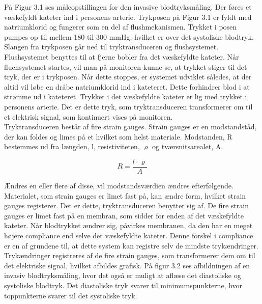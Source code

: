 På Figur 3.1 ses måleopstillingen for den invasive blodtryksmåling. Der føres et væskefyldt kateter ind i personens arterie. Trykposen på Figur 3.1 er fyldt med natriumklorid og fungerer som en del af flushmekanismen. Trykket i posen pumpes op til mellem 180 til 300 mmHg, hvilket er over det systoliske blodtryk. \\
Slangen fra trykposen går ned til tryktransduceren og flushsystemet. Flushsystemet benyttes til at fjerne bobler fra det væskefyldte kateter. Når fluchsystemet startes, vil man på monitoren kunne se, at trykket stiger til det tryk, der er i trykposen. Når dette stoppes, er systemet udviklet således, at der altid vil løbe en dråbe natriumklorid ind i kateteret. Dette forhindrer blod i at strømme ud i kateteret. Trykket i det væskefyldte kateter er lig med trykket i personens arterie. Det er dette tryk, som tryktransduceren transformerer om til et elektrisk signal, som kontinuert vises på monitoren. \\
Tryktransduceren består af fire strain gauges. Strain gauges er en modstandståd, der kan foldes og limes på et hvilket som helst materiale. Modstanden, R bestemmes ud fra længden, l, resistiviteten, $\varrho$ og tværsnitsarealet, A. 

\begin{equation}
	R = \frac{l \cdot \varrho}{A}
\end{equation}

Ændres en eller flere af disse, vil modstandsværdien ændres efterfølgende. Materialet, som strain gauges er limet fast på, kan ændre form, hvilket strain gauges registerer. Det er dette, tryktransduceren benytter sig af. De fire strain gauges er limet fast på en membran, som sidder for enden af det væskefyldte kateter. Når blodtrykket ændrer sig, påvirkes membranen, da den har en meget højere compliance end selve det væskefyldte kateter. Denne forskel i compliance er en af grundene til, at dette system kan registre selv de mindste trykændringer. \\ 
Trykændringer registreres af de fire strain gauges, som transformerer dem om til det elektriske signal, hvilket afbildes grafisk. På figur 3.2 ses afbildningen af en invasiv blodtryksmåling, hvor det også er muligt at aflæse det diastoliske og systoliske blodtryk.  Det diastoliske tryk svarer til minimumspunkterne, hvor toppunkterne svarer til det systoliske tryk.


